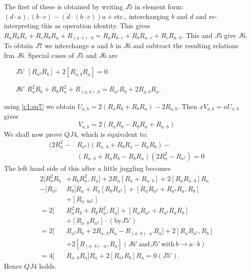 The first of these is obtained by writing $J5$ in element form:
$(d\cdot a), (b\cdot c)-(d\cdot(b\cdot c))a+$etc., interchanging $b$
and $d$ and re-interpreting this as operation identity. This gives
$R_aR_bR_c+R_cR_bR_a+R_{(a\cdot c)\cdot b}=R_aR_{b\cdot c}+R_b
R_{a\cdot c}+ R_cR_{a\cdot b}$. This and $J5$ give $J6$. To obtain
$J7$ we interchange $a$ and  $b$ in $J6$ and subtract the resulting
relations frm $J6$. Special cases of $J5$ and $J6$ are 
\begin{itemize}
\item[$J5'$] $[R_{a^{2}}R_b]+2[R_{a,b}R_a]=0$

\item[$J6'$] $R_a^{2}R_b+R_b R^{2}_a+R_{(a,b),b}=R_{a^{2}}R_b+2R_{a,b}R_a$.
\end{itemize}
using \eqref{c1:eq7} we obtain $U_{a,b}=2(R_aR_b+R_b
R_a)-2R_{a,b}$. Then $xV_{a,b}=a U_{x,b}$ gives 
\begin{equation*}
  V_{a,b}=2(R_aR_b-R_bR_a+R_{a\cdot b})\tag{9}\label{c1:eq9}
\end{equation*}\pageoriginale
We shall now prove $QJ4$, which is equivalent to:
\begin{align*}
(2R^{2}_a-&R_{a^{2}})(R_{a\cdot b}+R_b R_a - R_a R_b)-\\
&(R_{a\cdot b}+R_a R_b -R_b R_a)(2R^{2}_a-R_{a^{2}})=0
\end{align*}
The left hand side of this after a little juggling becomes
\begin{align*}
  2[R^{2}_a R_b&+R_b R_a^{2},R_a]+2R_a[R_a+R_{a\cdot b}]+2[R_a R_{a\cdot b}]R_a\\
  -[R_{a^{2}}&R_b]R_a+R_a[R_b R_{a^{2}}]+[R_a R_{a^{2}}+R_{a^{2}}R_a, R_b]\\
  &+[R_{a\cdot b a^{2}}]\\
  =2[&R^{2}_aR_b+R_b R^{2}_a, R_a]+[R_aR_{a^{2}}+R_{a^{2}}R_aR_b]\\
  &+[R_{a\cdot b}R_{a^{2}}]\cdot (\text{by} J5')\\
  =2[&R_{a^{2}} R_b+2R_{a\cdot b} R_a-R_{(a\cdot b)\cdot a'}
    R_a]+2[R_aR_{a^{2}},R_b]\\ 
  &+2[R_{(a\cdot b)\cdot a}, R_a] (J6' \,\text{and}\, J5' \,\text{with}\, b\to
  a\cdot b)\\ 
  =4[&R_{a\cdot b} R_a]R_a+2[R_{a^{2}}R_b]R_a=0(J5').
\end{align*}
Hence $QJ4$ holds.

